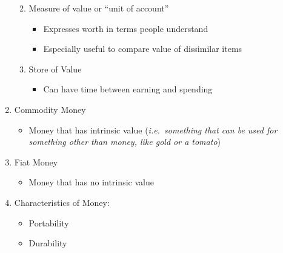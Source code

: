 \documentclass[12pt]{article}
\begin{document}
\begin{enumerate}
\begin{enumerate}
\begin{itemize}
        \end{itemize}

      \item Measure of value or “unit of account”

        \begin{itemize}

          \item Expresses worth in terms people understand

          \item Especially useful to compare value of dissimilar items

        \end{itemize}

      \item Store of Value

        \begin{itemize}

          \item Can have time between earning and spending

        \end{itemize}

    \end{enumerate}

  \item Commodity Money

    \begin{itemize}

      \item Money that has intrinsic value (\textit{i.e.\ something that can be used for something other than money, like gold or a tomato})

    \end{itemize}

  \item Fiat Money

    \begin{itemize}

      \item Money that has no intrinsic value

    \end{itemize}

  \item Characteristics of Money:

    \begin{itemize}

      \item Portability

      \item Durability


\end{itemize}
\end{enumerate}
\end{document}

